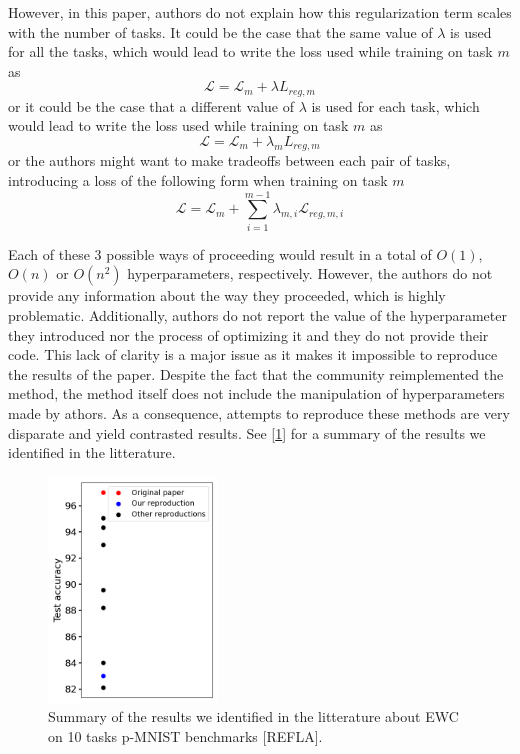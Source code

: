 \documentclass[11pt]{article}
\begin{document}
\vspace{2mm}
\noindent
However, in this paper, authors do not explain how this regularization term scales with the number of tasks. It could be the case that the same value of $\lambda$ is used for all the tasks, which would lead to write the loss used while training on task $m$ as 
\begin{equation}
    \mathcal{L} = \mathcal{L}_{m} + \lambda{L}_{reg,m}
\end{equation}
or it could be the case that a different value of $\lambda$ is used for each task, which would lead to write the loss used while training on task $m$ as
\begin{equation}
    \mathcal{L} = \mathcal{L}_{m} + \lambda_{m}{L}_{reg,m}
\end{equation}
or the authors might want to make tradeoffs between each pair of tasks, introducing a loss of the following form when training on task $m$
\begin{equation}
    \mathcal{L} = \mathcal{L}_{m} + \sum_{i=1}^{m-1}\lambda_{m,i}\mathcal{L}_{reg,m,i}
\end{equation}

\vspace{2mm}
\noindent
Each of these $3$ possible ways of proceeding would result in a total of $O(1)$, $O(n)$ or $O(n^2)$ hyperparameters, respectively. However, the authors do not provide any information about the way they proceeded, which is highly problematic. Additionally, authors do not report the value of the hyperparameter they introduced nor the process of optimizing it and they do not provide their code. This lack of clarity is a major issue as it makes it impossible to reproduce the results of the paper. Despite the fact that the community reimplemented the method, the method itself does not include the manipulation of hyperparameters made by athors. As a consequence, attempts to reproduce these methods are very disparate and yield contrasted results. See [\ref{fig:EWCs}] for a summary of the results we identified in the litterature.

\begin{figure}
    \centering
    \includegraphics[width=0.40\textwidth]{images/EWCs.png}
    \caption{Summary of the results we identified in the litterature about EWC on 10 tasks p-MNIST benchmarks [REFLA].}
    \label{fig:EWCs}
\end{figure}
\end{document}

